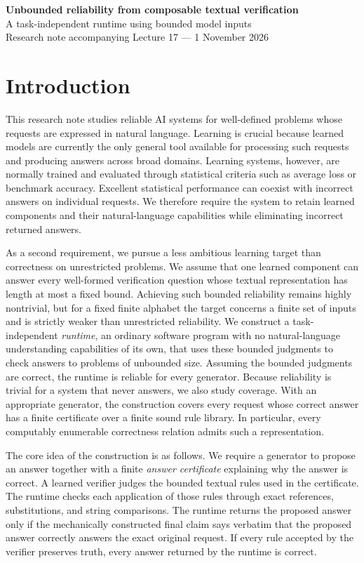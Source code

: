 \documentclass[11pt,twoside]{article}
\theoremstyle{definition}
\begin{document}
\begin{center}
{\Large\bfseries Unbounded reliability from composable textual verification}\\[4pt]
{\large A task-independent runtime using bounded model inputs}\\[4pt]
Research note accompanying Lecture 17 --- 1 November 2026
\end{center}

\section*{Introduction}

This research note studies reliable AI systems for well-defined problems whose
requests are expressed in natural language. Learning is crucial because
learned models are currently the only general tool available for processing
such requests and producing answers across broad domains. Learning systems,
however, are normally trained and evaluated through statistical criteria such
as average loss or benchmark accuracy. Excellent statistical performance can
coexist with incorrect answers on individual requests. We therefore require
the system to retain learned components and their natural-language capabilities
while eliminating incorrect returned answers.

As a second requirement, we pursue a less ambitious learning target than
correctness on unrestricted problems. We assume that one learned component can
answer every well-formed verification question whose textual representation
has length at most a fixed bound. Achieving such bounded reliability remains
highly nontrivial, but for a fixed finite alphabet the target concerns a finite
set of inputs and is strictly weaker than unrestricted reliability. We
construct a task-independent \emph{runtime}, an ordinary software program with
no natural-language understanding capabilities of its own, that uses these
bounded judgments to check answers to problems of unbounded size. Assuming the
bounded judgments are correct, the runtime is reliable for every generator.
Because reliability is trivial for a system that never answers, we also study
coverage. With an appropriate generator, the construction covers every request
whose correct answer has a finite certificate over a finite sound rule library.
In particular, every computably enumerable correctness relation admits such a
representation.

The core idea of the construction is as follows. We require a generator to
propose an answer together with a finite \emph{answer certificate} explaining
why the answer is correct. A learned verifier judges the bounded textual rules
used in the certificate. The runtime checks each application of those rules
through exact references, substitutions, and string comparisons. The runtime
returns the proposed answer only if the mechanically constructed final claim
says verbatim that the proposed answer correctly answers the exact original
request. If every rule accepted by the verifier preserves truth, every answer
returned by the runtime is correct.
\end{document}
